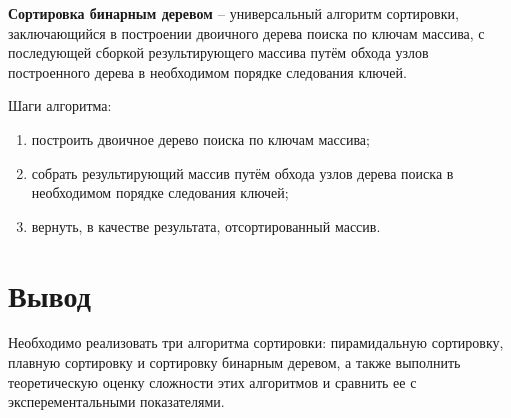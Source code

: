 \textbf{Сортировка бинарным деревом \cite{Knut}} -- универсальный алгоритм сортировки, заключающийся в построении двоичного дерева поиска по ключам массива, с последующей сборкой результирующего массива путём обхода узлов построенного дерева в необходимом порядке следования ключей.


Шаги алгоритма:
\begin{enumerate}[label=\arabic*)]
	\item построить двоичное дерево поиска по ключам массива;
	\item собрать результирующий массив путём обхода узлов дерева поиска в необходимом порядке следования ключей;
	\item вернуть, в качестве результата, отсортированный массив.
\end{enumerate}

\section*{Вывод}

Необходимо реализовать три алгоритма сортировки: пирамидальную сортировку, плавную сортировку и сортировку бинарным деревом, а также выполнить теоретическую оценку сложности этих алгоритмов и сравнить ее с эксперементальными показателями.



